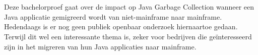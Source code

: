 
%
%
%
%
%

%



\chapter*{}
Deze bachelorproef gaat over de impact op Java Garbage Collection wanneer een Java applicatie gemigreerd wordt van niet-mainframe naar mainframe.
Hedendaags is er nog geen publiek openbaar onderzoek hiernaartoe gedaan.
Terwijl dit wel een interessante thema is, zeker voor bedrijven die geïnteresseerd zijn in het migreren van hun Java applicaties naar mainframe.



